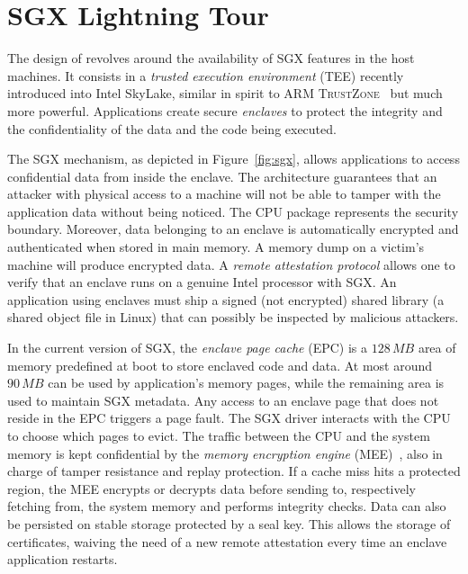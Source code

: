 \section{SGX Lightning Tour}\label{sec:background}

The design of \SYS{} revolves around the availability of SGX features in the host machines.
It consists in a \emph{trusted execution environment} (TEE) recently introduced into Intel{\textregistered} SkyLake, similar in spirit to ARM \textsc{TrustZone}~\cite{arm2009security} but much more powerful.
Applications create secure \emph{enclaves} to protect the integrity and the confidentiality of the data and the code being executed.

The SGX mechanism, as depicted in Figure~\ref{fig:sgx}, allows applications to access confidential data from inside the enclave.
The architecture guarantees that an attacker with physical access to a machine will not be able to tamper with the application data without being noticed.
The CPU package represents the security boundary.
Moreover, data belonging to an enclave is automatically encrypted and authenticated when stored in main memory.
A memory dump on a victim’s machine will produce encrypted data.
A \emph{remote attestation protocol} allows one to verify that an enclave runs on a genuine Intel{\textregistered} processor with SGX.
An application using enclaves must ship a signed (not encrypted) shared library (a shared object file in Linux) that can possibly be inspected by malicious attackers.

In the current version of SGX, the \emph{enclave page cache} (EPC) is a $128\,\mathit{MB}$ area of memory predefined at boot to store enclaved code and data.
At most around $90\,\mathit{MB}$ can be used by application’s memory pages, while the remaining area is used to maintain SGX metadata.
Any access to an enclave page that does not reside in the EPC triggers a page fault.
The SGX driver interacts with the CPU to choose which pages to evict.
The traffic between the CPU and the system memory is kept confidential by the \emph{memory encryption engine} (MEE)~\cite{gueron2016memory}, also in charge of tamper resistance and replay protection.
If a cache miss hits a protected region, the MEE encrypts or decrypts data before sending to, respectively fetching from, the system memory and performs integrity checks.
Data can also be persisted on stable storage protected by a seal key.
This allows the storage of certificates, waiving the need of a new remote attestation every time an enclave application restarts.

